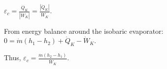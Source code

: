 \( \varepsilon_c = \frac{\dot{Q}_K}{|\dot{W}_K|} = \frac{|\dot{Q}_K|}{\dot{W}_K} \).  

From energy balance around the isobaric evaporator:  
\( 0 = \dot{m} (h_1 - h_2) + \dot{Q}_K - \dot{W}_K \).  

Thus, \( \varepsilon_c = \frac{\dot{m} (h_2 - h_1)}{\dot{W}_K} \).